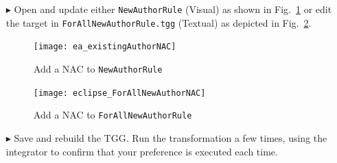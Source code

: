 \begin{itemize}

\item[$\blacktriangleright$] Open and update either \texttt{NewAuthorRule} (Visual) as shown in Fig.~\ref{ea:existingAuthorNAC} or edit the target in 
\texttt{ForAllNewAuthorRule.tgg} (Textual) as depicted in Fig.~\ref{eclipse:existingAuthorNAC}.


\begin{figure}[htbp]
\begin{center}
  \texttt{[image: ea\_existingAuthorNAC]}
  \caption{Add a NAC to \texttt{NewAuthorRule}}
  \label{ea:existingAuthorNAC}
\end{center}
\end{figure}

\begin{figure}[htbp]
\begin{center}
  \texttt{[image: eclipse\_ForAllNewAuthorNAC]}
  \caption{Add a NAC to \texttt{ForAllNewAuthorRule}}
  \label{eclipse:existingAuthorNAC}
\end{center}
\end{figure}

\item[$\blacktriangleright$] Save and rebuild the TGG. Run the transformation a few times, using the integrator to confirm that your preference is executed each
time. 

\end{itemize}
